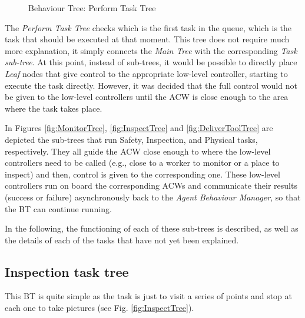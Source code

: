 \documentclass[fontsize=11pt, English=false, Español=true, Myfinal=true, twoside, numbers=noenddot]{scrbook}
\begin{document}
{\begin{figure}[ht]
\begin{center}
{\begin{tikzpicture}
		    \end{tikzpicture}}
		\caption{Behaviour Tree: Perform Task Tree}
		\label{fig:PerformTasksTree}
	\end{center}
\end{figure}

The \emph{Perform Task Tree} checks which is the first task in the queue, which is the task that should be executed at that moment. This tree does not require much more explanation, it simply connects the \emph{Main Tree} with the corresponding \emph{Task sub-tree}. At this point, instead of sub-trees, it would be possible to directly place \emph{Leaf} nodes that give control to the appropriate low-level controller, starting to execute the task directly. However, it was decided that the full control would not be given to the low-level controllers until the \gls{ACW} is close enough to the area where the task takes place.

In Figures \ref{fig:MonitorTree}, \ref{fig:InspectTree} and \ref{fig:DeliverToolTree} are depicted the sub-trees that run Safety, Inspection, and Physical tasks, respectively. They all guide the \gls{ACW} close enough to where the low-level controllers need to be called (e.g., close to a worker to monitor or a place to inspect) and then, control is given to the corresponding one. These low-level controllers run on board the corresponding \glspl{ACW} and communicate their results (success or failure) asynchronously back to the \emph{Agent Behaviour Manager}, so that the \gls{BT} can continue running.

In the following, the functioning of each of these sub-trees is described, as well as the details of each of the tasks that have not yet been explained.

\subsection{Inspection task tree}
\label{sec:InspectionTaskTree}
This \gls{BT} is quite simple as the task is just to visit a series of points and stop at each one to take pictures (see Fig. \ref{fig:InspectTree}).

\begin{figure}[ht]
	\begin{center}
\end{center}
\end{figure}}
\end{document}
